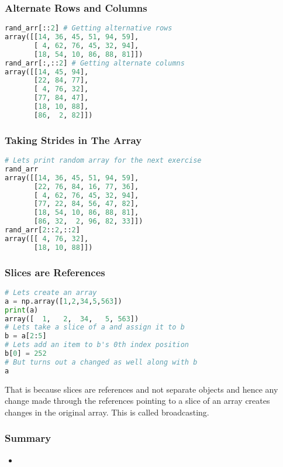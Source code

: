 \documentclass{beamer}
\begin{document}
\begin{frame}[fragile]
\frametitle{Alternate Rows and Columns}
\begin{lstlisting}[language=Python]
rand_arr[::2] # Getting alternative rows
array([[14, 36, 45, 51, 94, 59],
       [ 4, 62, 76, 45, 32, 94],
       [18, 54, 10, 86, 88, 81]])
rand_arr[:,::2] # Getting alternate columns
array([[14, 45, 94],
       [22, 84, 77],
       [ 4, 76, 32],
       [77, 84, 47],
       [18, 10, 88],
       [86,  2, 82]])
\end{lstlisting}
\end{frame}

\begin{frame}[fragile]
\frametitle{Taking Strides in The Array}
\begin{lstlisting}[language=Python]
# Lets print random array for the next exercise
rand_arr
array([[14, 36, 45, 51, 94, 59],
       [22, 76, 84, 16, 77, 36],
       [ 4, 62, 76, 45, 32, 94],
       [77, 22, 84, 56, 47, 82],
       [18, 54, 10, 86, 88, 81],
       [86, 32,  2, 96, 82, 33]])
rand_arr[2::2,::2]
array([[ 4, 76, 32],
       [18, 10, 88]])
\end{lstlisting}
\end{frame}

\begin{frame}[fragile]
\frametitle{Slices are References}
\begin{lstlisting}[language=Python]
# Lets create an array
a = np.array([1,2,34,5,563])
print(a)
array([  1,   2,  34,   5, 563])
# Lets take a slice of a and assign it to b
b = a[2:5]
# Lets add an item to b's 0th index position
b[0] = 252
# But turns out a changed as well along with b
a
\end{lstlisting}
That is because slices are references and not separate objects and hence any change made through the references pointing to a slice of an array creates changes in the original array. This is called broadcasting.
\end{frame}

\begin{frame}
\frametitle{Summary}
\begin{itemize}
\item 
\end{itemize}
\end{frame}
\end{document}
